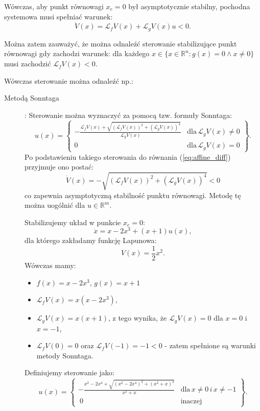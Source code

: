 \documentclass{article}
\begin{document}
    Wówczas, aby punkt równowagi $x_{e} = 0$ był asymptotycznie stabilny, pochodna systemowa musi spełniać warunek:
    \begin{equation} \label{eq:affine_diff}
        \dot{V}(x) = \mathcal{L}_{f}V(x) + \mathcal{L}_{g}V(x)u < 0.
    \end{equation}
    
    Można zatem zauważyć, że można odnaleźć sterowanie stabilizujące punkt równowagi gdy zachodzi warunek: dla każdego $x \in \{ x \in \mathbb{R}^{n}: g(x) = 0 \land x \neq 0 \}$ musi zachodzić $\mathcal{L}_{f}V(x) < 0$.

    Wówczas sterowanie można odnaleźć np.:
    \begin{description}
        \item[Metodą Sonntaga]:
        Sterowanie można wyznaczyć za pomocą tzw. formuły Sonntaga:
        $$
            u(x)
            =
            \left\{
            \begin{array}{cl}
                 -\frac{\mathcal{L}_{f}V(x) + \sqrt{(\mathcal{L}_{f}V(x))^{2} + (\mathcal{L}_{g}V(x))^{4}}}{\mathcal{L}_{g}V(x)} &   \text{dla}\, \mathcal{L}_{g}V(x) \neq 0\\
                 0  &   \text{dla}\, \mathcal{L}_{g}V(x) = 0
            \end{array}
            \right\}.
        $$
        Po podstawieniu takiego sterowania do równania (\ref{eq:affine_diff}) przyjmuje ono postać:
        $$
            \dot{V}(x) = - \sqrt{(\mathcal{L}_{f}V(x))^{2} + (\mathcal{L}_{g}V(x))^{4}} < 0
        $$
        co zapewnia asymptotyczną stabilność punktu równowagi.
        Metodę tę można uogólnić dla $u \in \mathbb{R}^{m}$.

        \begin{tcolorbox}[colback=green!5, colframe=green!75!black, title=Przykład]
        Stabilizujemy układ w punkcie $x_{e} = 0$:
        $$
            \dot{x} = x - 2x^{3} + (x+1)u(x),
        $$
        dla którego zakładamy funkcję Lapunowa:
        $$
            V(x) = \frac{1}{2}x^{2}.
        $$
        Wówczas mamy:
        \begin{itemize}
            \item $f(x) = x - 2x^{3}$, $g(x) = x+1$
            \item $\mathcal{L}_{f}V(x) = x(x - 2x^{3})$,
            \item $\mathcal{L}_{g}V(x) = x(x+1)$, z tego wynika, że $\mathcal{L}_{g}V(x) = 0$ dla $x = 0$ i $x = -1$,
            \item $\mathcal{L}_{f}V(0) = 0$ oraz $\mathcal{L}_{f}V(-1) = -1 < 0$ - zatem spełnione są warunki metody Sonntaga.
        \end{itemize}
        Definiujemy sterowanie jako:
        $$
            u(x)
            =
            \left\{
            \begin{array}{cl}
                 -\frac{x^{2} - 2x^{4} + \sqrt{(x^{2} - 2x^{4})^{2} + (x^{2} + x)^{4}}}{x^{2} + x} &   \text{dla}\, x \neq 0 \, i\, x \neq -1 \\\
                 0  &   \text{inaczej}
            \end{array}
            \right\}.
        $$
        \end{tcolorbox}
    

\end{description}
\end{document}
